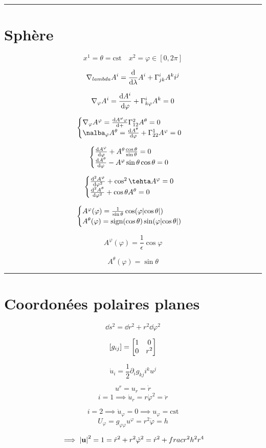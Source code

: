\hrule 
\section*{Sphère}


$$x^{1}= \theta = \text{cst} \quad x^{2}= \varphi \in [0,2\pi]$$ 

$$\nabla_{lambda} A^{i}= \dv{{}}{\lambda} A^{i}+ \Gamma_{jk}^{i}A^{k}i^j$$ 

$$\nabla_{\varphi} A^{i}= \dv{A^{i}}{\varphi} + \Gamma_{k\varphi}^{i}A^{k}= 0$$ 


$$\begin{cases}
	\nabla_{\varphi} A^{\varphi} = \dv{A^{\varphi}\varphi}{+} \Gamma_{12}^{2}A^{\theta}=0 \\
	
\nalba_{\varphi} A^{\theta}= \dv{A^{\theta}}{\varphi} + \Gamma_{22}^{1}A^{\varphi}= 0 
\end{cases}$$

$$\begin{cases}
	
\dv{A^{\varphi}}{\varphi} +A^{\theta} \frac{ \cos\theta }{\sin\theta} =0 \\\dv{A^{\theta}}{\varphi} - A^{\varphi}\sin\theta\cos\theta =0 
\end{cases}$$

$$\begin{cases}
	\dv[2]{A^{\varphi}}{\varphi} + \cos^{2}\tehta A^{\varphi}= 0\\
	\dv[2]{A^{\theta}}{\varphi} + \cos\theta A^{\theta}= 0
\end{cases}$$ 


$$\begin{cases}
A^{\varphi}(\varphi) = \frac{1}{\sin\theta} \cos(\varphi \abs{\cos\theta} )\\
A^{\theta}(\varphi) = \text{sign} (\cos\theta)\sin(\varphi \abs{\cos\theta} )
\end{cases}$$ 

$$A^{\varphi}(\varphi) = \frac{1}{\epsilon} \cos\varphi $$ 

$$A^{\theta}(\varphi) = \sin\theta$$ 


\hrule

\section*{Coordonées polaires planes}


$$\dd s^{2}= \dd r^{2}+ r^{2}\dd \varphi^2$$ 

$$[ g_{ij} ] = \mqty[1 & 0 \\ 0 & r^2]$$ 


$$\dot u_i = \frac{1}{2} \partial_i g_{kj} i^{k}u^{j}$$ 


$$u^{r}= u_r = \dot r $$ 
$$i=1 \implies \dot u_r = r\dot \varphi^{2}= \ddot r$$ 

$$i=2 \implies \dot u_{\varphi} = 0 \implies u_{\varphi} = \text{cst} $$ 
$$U_{\varphi} = g_{\varphi\varphi} u^{\varphi}= r^{2}\dot \varphi = h$$ 

$$\implies \abs{\vb{u}}^{2} =1 = \dot r^{2}+ r^{2}\dot \varphi^{2}= \dot r^{2}+ frac r^2h^{2} r^{4}$$ 





